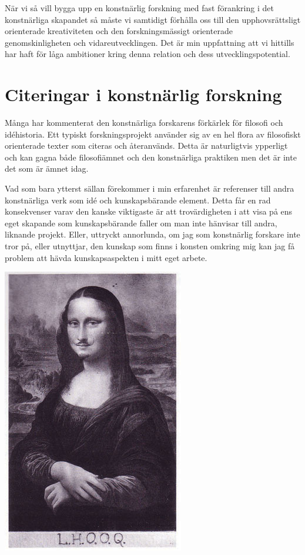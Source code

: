 \documentclass{article}
\begin{document}
När vi så vill bygga upp en konstnärlig forskning med fast förankring i det konstnärliga skapandet så måste vi samtidigt förhålla oss till den upphovsrättsligt orienterade kreativiteten och den forskningsmässigt orienterade genomskinligheten och vidareutvecklingen. Det är min uppfattning att vi hittills har haft för låga ambitioner kring denna relation och dess utvecklingspotential.

\section{Citeringar i konstnärlig forskning}

Många har kommenterat den konstnärliga forskarens förkärlek för filosofi och idéhistoria. Ett typiskt forskningsprojekt använder sig av en hel flora av filosofiskt orienterade texter som citeras och återanvänds. Detta är naturligtvis ypperligt och kan gagna både filosofiämnet och den konstnärliga praktiken men det är inte det som är ämnet idag.

Vad som bara ytterst sällan förekommer i min erfarenhet är referenser till andra konstnärliga verk som idé och kunskapsbärande element. Detta får en rad konsekvenser varav den kanske viktigaste är att trovärdigheten i att visa på ens eget skapande som kunskapsbärande faller om man inte hänvisar till andra, liknande projekt. Eller, uttryckt annorlunda, om jag som konstnärlig forskare inte tror på, eller utnyttjar, den kunskap som finns i konsten omkring mig kan jag få problem att hävda kunskapsaspekten i mitt eget arbete.

\includegraphics[]{./img/duchamp.jpg}
\end{document}
